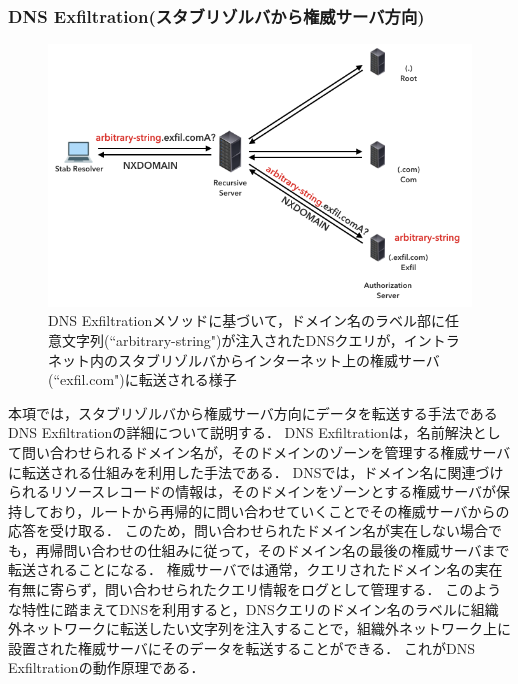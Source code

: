 \subsubsection{DNS Exfiltration(スタブリゾルバから権威サーバ方向)}
\label{sec:dns-exfiltration}
\begin{figure}[h]
 \centering
 \includegraphics[width=12.0cm]{figure/dns-exfiltration.png}
 \caption[DNS Exfiltrationの概略図]{DNS Exfiltrationメソッドに基づいて，ドメイン名のラベル部に任意文字列(``arbitrary-string")が注入されたDNSクエリが，イントラネット内のスタブリゾルバからインターネット上の権威サーバ(``exfil.com")に転送される様子}
 \label{fig:dns-exfiltration}
\end{figure}


本項では，スタブリゾルバから権威サーバ方向にデータを転送する手法であるDNS Exfiltrationの詳細について説明する．
DNS Exfiltrationは，名前解決として問い合わせられるドメイン名が，そのドメインのゾーンを管理する権威サーバに転送される仕組みを利用した手法である．
DNSでは，ドメイン名に関連づけられるリソースレコードの情報は，そのドメインをゾーンとする権威サーバが保持しており，ルートから再帰的に問い合わせていくことでその権威サーバからの応答を受け取る．
このため，問い合わせられたドメイン名が実在しない場合でも，再帰問い合わせの仕組みに従って，そのドメイン名の最後の権威サーバまで転送されることになる．
権威サーバでは通常，クエリされたドメイン名の実在有無に寄らず，問い合わせられたクエリ情報をログとして管理する．
このような特性に踏まえてDNSを利用すると，DNSクエリのドメイン名のラベルに組織外ネットワークに転送したい文字列を注入することで，組織外ネットワーク上に設置された権威サーバにそのデータを転送することができる．
これがDNS Exfiltrationの動作原理である．


